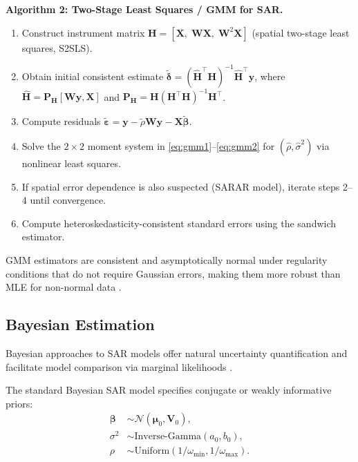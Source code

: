 \documentclass[conference]{IEEEtran}
\theoremstyle{definition}
\begin{document}
\textbf{Algorithm 2: Two-Stage Least Squares / GMM for SAR.}
\begin{enumerate}
\item Construct instrument matrix $\mathbf{H} = [\mathbf{X},\; \mathbf{W}\mathbf{X},\; \mathbf{W}^2\mathbf{X}]$ (spatial two-stage least squares, S2SLS).
\item Obtain initial consistent estimate $\tilde{\bm{\delta}} = (\hat{\mathbf{H}}^\top\mathbf{H})^{-1}\hat{\mathbf{H}}^\top\mathbf{y}$, where $\hat{\mathbf{H}} = \mathbf{P}_{\mathbf{H}}[\mathbf{W}\mathbf{y}, \mathbf{X}]$ and $\mathbf{P}_{\mathbf{H}} = \mathbf{H}(\mathbf{H}^\top\mathbf{H})^{-1}\mathbf{H}^\top$.
\item Compute residuals $\tilde{\bm{\varepsilon}} = \mathbf{y} - \tilde{\rho}\mathbf{W}\mathbf{y} - \mathbf{X}\tilde{\bm{\beta}}$.
\item Solve the $2\times 2$ moment system in \eqref{eq:gmm1}--\eqref{eq:gmm2} for $(\hat{\rho}, \hat{\sigma}^2)$ via nonlinear least squares.
\item If spatial error dependence is also suspected (SARAR model), iterate steps 2--4 until convergence.
\item Compute heteroskedasticity-consistent standard errors using the sandwich estimator.
\end{enumerate}

GMM estimators are consistent and asymptotically normal under regularity conditions that do not require Gaussian errors, making them more robust than MLE for non-normal data \cite{kelejian1999generalized}.

\subsection{Bayesian Estimation}

Bayesian approaches to SAR models offer natural uncertainty quantification and facilitate model comparison via marginal likelihoods \cite{lesage2009introduction,lacombe2004bayesian}.

The standard Bayesian SAR model specifies conjugate or weakly informative priors:
\begin{align}
\bm{\beta} &\sim \mathcal{N}(\bm{\mu}_0, \mathbf{V}_0), \\
\sigma^2 &\sim \text{Inverse-Gamma}(a_0, b_0), \\
\rho &\sim \text{Uniform}(1/\omega_{\min}, 1/\omega_{\max}).
\end{align}
\end{document}
